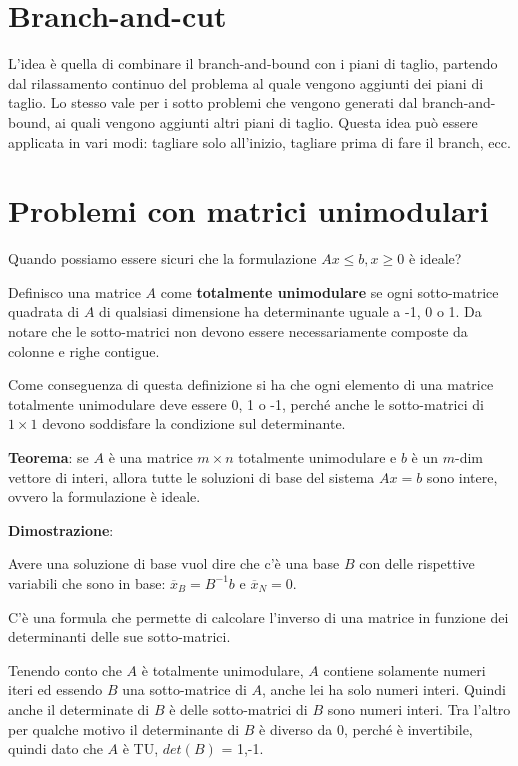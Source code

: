 

\section{Branch-and-cut}

L'idea è quella di combinare il branch-and-bound con i piani di taglio, partendo dal rilassamento continuo del problema al quale vengono aggiunti dei piani di taglio.
Lo stesso vale per i sotto problemi che vengono generati dal branch-and-bound, ai quali vengono aggiunti altri piani di taglio.
Questa idea può essere applicata in vari modi: tagliare solo all'inizio, tagliare prima di fare il branch, ecc.

\section{Problemi con matrici unimodulari}

Quando possiamo essere sicuri che la formulazione $Ax \leq b, x \geq 0$ è ideale?

Definisco una matrice $A$ come \textbf{totalmente unimodulare} se ogni sotto-matrice quadrata di $A$ di qualsiasi dimensione ha determinante uguale a -1, 0 o 1. Da notare che le sotto-matrici non devono essere necessariamente composte da colonne e righe contigue.

Come conseguenza di questa definizione si ha che ogni elemento di una matrice totalmente unimodulare deve essere 0, 1 o -1, perché anche le sotto-matrici di $1\times1$ devono soddisfare la condizione sul determinante.

\textbf{Teorema}: se $A$ è una matrice $m\times n$ totalmente unimodulare e $b$ è un $m$-dim vettore di interi, allora tutte le soluzioni di base del sistema $Ax = b$ sono intere, ovvero la formulazione è ideale.

\textbf{Dimostrazione}:

Avere una soluzione di base vuol dire che c'è una base $B$ con delle rispettive variabili che sono in base: $\overline{x}_B = B^{-1}b$ e $\overline{x}_N = 0$.

C'è una formula che permette di calcolare l'inverso di una matrice in funzione dei determinanti delle sue sotto-matrici.

Tenendo conto che $A$ è totalmente unimodulare, $A$ contiene solamente numeri iteri ed essendo $B$ una sotto-matrice di $A$, anche lei ha solo numeri interi. Quindi anche il determinate di $B$ è delle sotto-matrici di $B$ sono numeri interi. 
Tra l'altro per qualche motivo il determinante di $B$ è diverso da 0, perché è invertibile, quindi dato che $A$ è TU, $det(B)$ = 1,-1.

